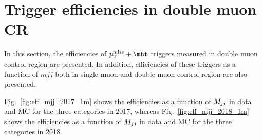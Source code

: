 \section{Trigger efficiencies in double muon CR}
\label{sec:more_trigger}

In this section, the efficiencies of $\ptmiss+\mht$ triggers measured in double muon control region are presented.
In addition, efficiencies of these triggers as a function of $mjj$ both in single muon and double muon control region are also presented.

Fig.~\ref{fig:eff_mjj_2017_1m} shows the efficiencies as a function of $M_{jj}$ in data and MC for the three categories in 2017,
whereas Fig.~\ref{fig:eff_mjj_2018_1m} shows the efficiencies as a function of $M_{jj}$ in data and MC for the three categories in 2018.

